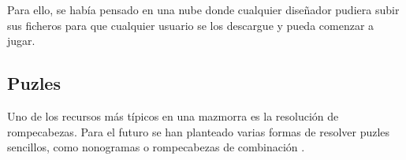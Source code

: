 Para ello, se había pensado en una nube donde cualquier diseñador pudiera subir sus ficheros para que cualquier usuario se los descargue y pueda comenzar a jugar.

\subsection{Puzles}
Uno de los recursos más típicos en una mazmorra es la resolución de rompecabezas. Para el futuro se han planteado varias formas de resolver puzles sencillos, como nonogramas \cite{nonograms} o rompecabezas de combinación \cite{combinationPuzzles}.

